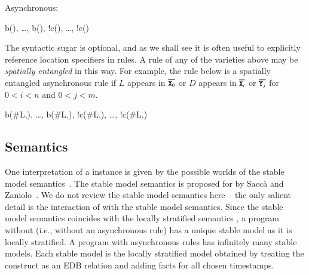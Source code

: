 %

Asynchronous:

\begin{Drules}
        {b(), \ldots, b(), !c(), \ldots, !c()}
\end{Drules}

The syntactic sugar is optional, and as we shall see it is often useful to explicitly reference location specifiers in rules.  A rule of any of the
varieties above may be \emph{spatially entangled} in this way. For example, the rule below is a spatially entangled asynchronous rule if $L$ appears
in $\od{X\sub{0}}$ or $D$ appears in $\od{X\sub{i}}$ or $\od{Y\sub{j}}$ for $0 < i < n$ and $0 < j < m$.

\begin{Drules}
        {b(\#L,), \ldots, b(\#L,), !c(\#L,), \ldots, !c(\#L,)}
\end{Drules}


\subsection{Semantics}
One interpretation of a \lang instance is given by the possible worlds of the
stable model semantics~\cite{stable-model}.  The stable model semantics is proposed for  by Sacc\`{a} and Zaniolo~\cite{sacca-zaniolo}.
We do not review the stable model
semantics here -- the only salient detail is the interaction of 
with the stable model semantics.  Since the stable model semantics coincides with the locally stratified semantics , a \lang program without  (i.e., without an asynchronous rule) has a unique stable model as it is locally stratified.  A \lang program with asynchronous rules has infinitely many stable models.  Each stable model is the locally stratified model obtained by treating the  construct as an EDB relation and adding facts for all chosen timestamps.

